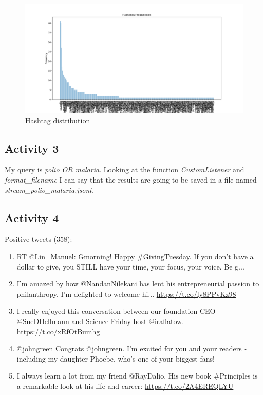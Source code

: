 \documentclass[a4paper]{article}
\begin{document}
\begin{figure}[!hbtp]
\centering
\includegraphics[width=\textwidth]{res/img/hashtags_distribution}
\caption{Hashtag distribution}
\label{fig:hashtags_distribution}
\end{figure}


\subsection{Activity 3}

My query is \emph{polio OR malaria}. Looking at the function \emph{CustomListener} and \emph{format\_filename} I can say that the results are going to be saved in a file named \emph{stream\_polio\_malaria.jsonl}.

\subsection{Activity 4}

Positive tweets (358):

\begin{enumerate}
\item RT @Lin\_Manuel: Gmorning! Happy \#GivingTuesday. If you don't have a dollar to give, you STILL have your time, your focus, your voice. Be g...
\item I'm amazed by how @NandanNilekani has lent his entrepreneurial passion to philanthropy. I'm delighted to welcome hi... \url{https://t.co/ly8PPvKz98}
\item I really enjoyed this conversation between our foundation CEO @SueDHellmann and Science Friday host @iraflatow. \url{https://t.co/xRfOtBumhg}
\item @johngreen Congrats @johngreen. I'm excited for you and your readers - including my daughter Phoebe, who's one of your biggest fans!
\item I always learn a lot from my friend @RayDalio. His new book \#Principles is a remarkable look at his life and career: \url{https://t.co/2A4EREQLYU}
\end{enumerate}
\end{document}
